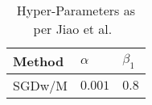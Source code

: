 \begin{table}[ht]
    \centering
    \caption{Hyper-Parameters as per Jiao et al.~\cite{jiao_gru-rnn_2020}}
    \label{tab:params-jiao}
    \begin{tabular}{ p{6.0cm} p{1.5cm} p{1.5cm}   }
        \hline
        Method     & $\alpha$ & $\beta_1 $  \\
        \hline
        SGDw/M
                & $0.001$ & $0.8$  \\%
        \hline
    \end{tabular}
\end{table}
